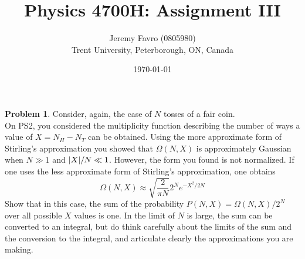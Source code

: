 \documentclass[10pt]{article}
\title{Physics 4700H: Assignment III}
\author{Jeremy Favro (0805980) \\ Trent University, Peterborough, ON, Canada}
\date{\today}
\theoremstyle{definition}
\newtheorem{problem}{Problem}
\begin{document}
\maketitle

\begin{problem} Consider, again, the case of $N$ tosses of a fair coin.\\
On PS2, you considered the multiplicity function describing the number of ways a value of
$X = N_H -N_T$ can be obtained. Using the more approximate form of Stirling's approximation
you showed that $\Omega(N, X)$ is approximately Gaussian when $N \gg 1$ and $\abs{X}/N\ll1$.
However, the form you found is not normalized.
If one uses the less approximate form of Stirling's approximation, one obtains
$$\Omega(N,X)\approx\sqrt{\frac{2}{\pi N}}2^Ne^{-X^2/2N}$$
Show that in this case, the sum of the probability $P (N, X) = \Omega(N, X)/2^N$ over all possible
$X$ values is one. In the limit of $N$ is large, the sum can be converted to an integral, but do
think carefully about the limits of the sum and the conversion to the integral, and articulate
clearly the approximations you are making.
\end{problem}
\end{document}

